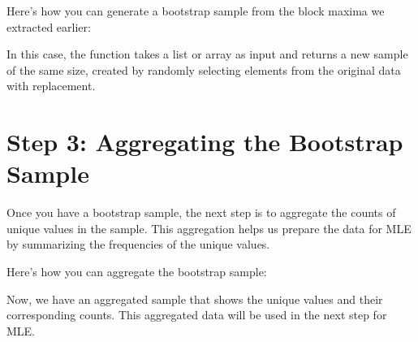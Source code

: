 \documentclass[a4paper,11pt,openany,english]{sphinxmanual}
\begin{document}
\sphinxAtStartPar
Here’s how you can generate a bootstrap sample from the block maxima we extracted earlier:

\begin{sphinxVerbatim}[commandchars=\\\{\}]
   

  
 
\end{sphinxVerbatim}

\sphinxAtStartPar
In this case, the  function takes a list or array as input and returns a new sample of the same size, created by randomly selecting elements from the original data with replacement.


\section{Step 3: Aggregating the Bootstrap Sample}
\label{\detokenize{bootstrap:step-3-aggregating-the-bootstrap-sample}}
\sphinxAtStartPar
Once you have a bootstrap sample, the next step is to aggregate the counts of unique values in the sample. This aggregation helps us prepare the data for MLE by summarizing the frequencies of the unique values.

\sphinxAtStartPar
Here’s how you can aggregate the bootstrap sample:

\begin{sphinxVerbatim}[commandchars=\\\{\}]
   

  
 
\end{sphinxVerbatim}

\sphinxAtStartPar
Now, we have an aggregated sample that shows the unique values and their corresponding counts. This aggregated data will be used in the next step for MLE.
\end{document}

